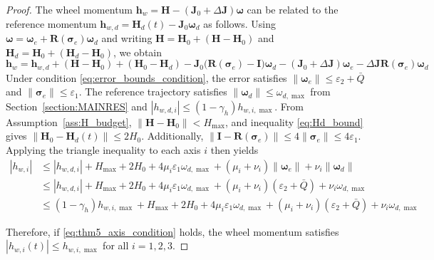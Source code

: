 \documentclass[journal]{new-aiaa}
\begin{document}
\begin{proof}
The wheel momentum $\boldsymbol{h}_w = \boldsymbol{H} - (\boldsymbol{J}_0+\Delta\boldsymbol{J})\boldsymbol{\omega}$ can be related to the reference momentum $\boldsymbol{h}_{w,d} = \boldsymbol{H}_d(t) - \boldsymbol{J}_0\boldsymbol{\omega}_d$ as follows.
Using $\boldsymbol{\omega} = \boldsymbol{\omega}_e + \boldsymbol{R}(\boldsymbol{\sigma}_e)\boldsymbol{\omega}_d$ and writing $\boldsymbol{H} = \boldsymbol{H}_0 + (\boldsymbol{H}-\boldsymbol{H}_0)$ and $\boldsymbol{H}_d = \boldsymbol{H}_0 + (\boldsymbol{H}_d-\boldsymbol{H}_0)$, we obtain
\[
\boldsymbol{h}_w = \boldsymbol{h}_{w,d} + (\boldsymbol{H} - \boldsymbol{H}_0) + (\boldsymbol{H}_0 - \boldsymbol{H}_d)
- \boldsymbol{J}_0\big(\boldsymbol{R}(\boldsymbol{\sigma}_e)-\boldsymbol{I}\big)\boldsymbol{\omega}_d
- (\boldsymbol{J}_0 + \Delta\boldsymbol{J})\boldsymbol{\omega}_e
- \Delta\boldsymbol{J}\boldsymbol{R}(\boldsymbol{\sigma}_e)\boldsymbol{\omega}_d
\]
Under condition \eqref{eq:error_bounds_condition}, the error satisfies $\|\boldsymbol{\omega}_e\| \le \varepsilon_2 + \bar Q$ and $\|\boldsymbol{\sigma}_e\| \le \varepsilon_1$.
The reference trajectory satisfies $\|\boldsymbol{\omega}_d\| \le \omega_{d,\max}$ from Section~\ref{section:MAINRES}
and $|h_{w,d,i}| \le (1 - \gamma_h) h_{w,i,\max}$.
From Assumption~\ref{ass:H_budget}, $\|\boldsymbol{H} - \boldsymbol{H}_0\| < H_{\max}$, and inequality \eqref{eq:Hd_bound} gives $\|\boldsymbol{H}_0 - \boldsymbol{H}_d(t)\| \le 2H_0$.
Additionally, $\|\boldsymbol{I} - \boldsymbol{R}(\boldsymbol{\sigma}_e)\| \le 4\|\boldsymbol{\sigma}_e\| \le 4\varepsilon_1$.
Applying the triangle inequality to each axis $i$ then yields
\begin{align}
  |h_{w,i}| &\le |h_{w,d,i}| + H_{\max} + 2H_0 + 4\mu_i\varepsilon_1\omega_{d,\max} + (\mu_i + \nu_i)\|\boldsymbol{\omega}_e\| + \nu_i\|\boldsymbol{\omega}_d\| \nonumber \\
  &\le |h_{w,d,i}| + H_{\max} + 2H_0 + 4\mu_i\varepsilon_1\omega_{d,\max} + (\mu_i + \nu_i) (\varepsilon_2 + \bar Q) + \nu_i \omega_{d,\max} \nonumber \\
  &\le (1 - \gamma_h) h_{w,i,\max} + H_{\max} + 2H_0 + 4\mu_i\varepsilon_1\omega_{d,\max} + (\mu_i + \nu_i) (\varepsilon_2 + \bar Q) + \nu_i \omega_{d,\max}
\end{align}

Therefore, if \eqref{eq:thm5_axis_condition} holds, the wheel momentum satisfies $|h_{w,i}(t)|\le h_{w,i,\max}$ for all $i=1,2,3$.
\end{proof}
\end{document}
